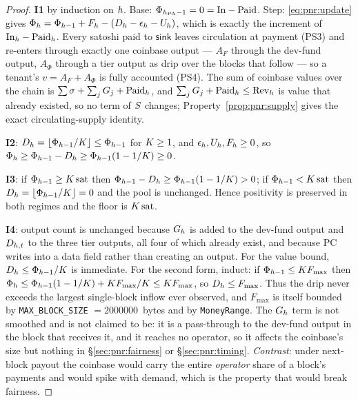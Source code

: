 \begin{proof}
\textbf{I1} by induction on $h$. Base: $\Phi_{h_{\mathrm{PA}}-1} = 0 = \mathrm{In} - \mathrm{Paid}$.
Step: \eqref{eq:pnr:update} gives
$\Phi_{h} = \Phi_{h-1} + F_{h} - (D_{h} - \epsilon_{h} - U_{h})$, which is exactly the
increment of $\mathrm{In}_{h} - \mathrm{Paid}_{h}$. Every satoshi paid to $\mathsf{sink}$ leaves
circulation at payment (PS3) and re-enters through exactly one coinbase output --- $A_F$ through the
dev-fund output, $A_\Phi$ through a tier output as drip over the blocks that follow --- so a
tenant's $v = A_F + A_\Phi$ is fully accounted (PS4). The sum of coinbase values over the chain is
$\sum\sigma + \sum_j G_j + \mathrm{Paid}_{h}$, and $\sum_j G_j + \mathrm{Paid}_{h} \le
\mathrm{Rev}_{h}$ is value that already existed, so no term of $S$ changes;
Property~\ref{prop:pnr:supply} gives the exact circulating-supply identity.

\textbf{I2}: $D_{h} = \lfloor\Phi_{h-1}/K\rfloor \le \Phi_{h-1}$ for $K \ge 1$, and
$\epsilon_{h}, U_{h}, F_{h} \ge 0$, so
$\Phi_{h} \ge \Phi_{h-1} - D_{h} \ge \Phi_{h-1}(1 - 1/K) \ge 0$.

\textbf{I3}: if $\Phi_{h-1} \ge K\,\mathrm{sat}$ then
$\Phi_{h-1} - D_{h} \ge \Phi_{h-1}(1 - 1/K) > 0$; if $\Phi_{h-1} < K\,\mathrm{sat}$ then
$D_{h} = \lfloor\Phi_{h-1}/K\rfloor = 0$ and the pool is unchanged. Hence positivity is
preserved in both regimes and the floor is $K\,\mathrm{sat}$.

\textbf{I4}: output count is unchanged because $G_{h}$ is added to the dev-fund output and
$D_{h,t}$ to the three tier outputs, all four of which already exist, and because PC writes into
a data field rather than creating an output. For the value bound,
$D_{h} \le \Phi_{h-1}/K$ is immediate. For the second form, induct: if
$\Phi_{h-1} \le K F_{\max}$ then
$\Phi_{h} \le \Phi_{h-1}(1 - 1/K) + K F_{\max}/K \le K F_{\max}$, so
$D_{h} \le F_{\max}$. Thus the drip never exceeds the largest single-block inflow ever observed,
and $F_{\max}$ is itself bounded by \texttt{MAX\_BLOCK\_SIZE} $= \num{2000000}$~bytes and by
\texttt{MoneyRange}. The $G_{h}$ term is not smoothed and is not claimed to be: it is a pass-through
to the dev-fund output in the block that receives it, and it reaches no operator, so it affects the
coinbase's size but nothing in \S\ref{sec:pnr:fairness} or \S\ref{sec:pnr:timing}. \emph{Contrast}:
under next-block payout the coinbase would carry the entire \emph{operator} share of a block's
payments and would spike with demand, which is the property that would break fairness.


\end{proof}
